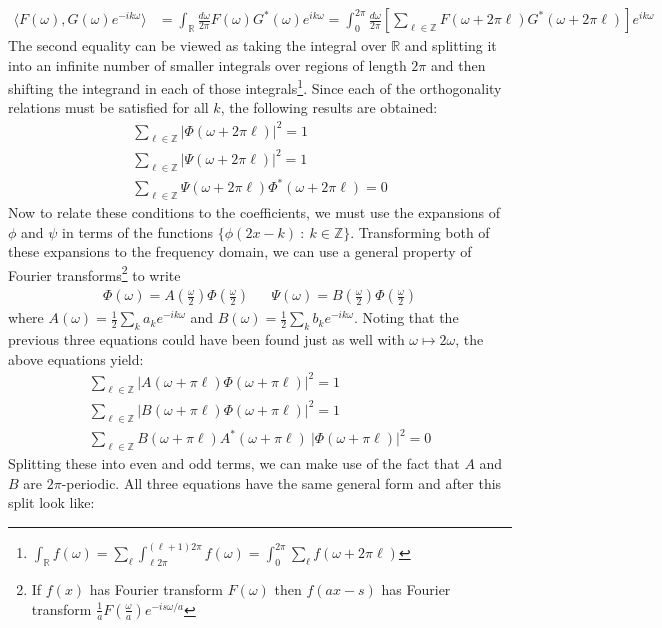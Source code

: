 \documentclass[onecolumn]{gwclass}
\begin{document}
\begin{align*}
	\langle F(\omega), G(\omega)e^{-ik\omega}\rangle &= \int_\mathbb{R}\frac{d\omega}{2\pi}F(\omega)G^*(\omega)e^{ik\omega} = \int_{0}^{2\pi}\frac{d\omega}{2\pi}\left[\sum_{\ell\in\mathbb{Z}}F(\omega + 2\pi\ell)G^*(\omega + 2\pi\ell)\right]e^{ik\omega}  
\end{align*}
The second equality can be viewed as taking the integral over $\mathbb{R}$ and splitting it into an infinite number of smaller integrals over regions of length $2\pi$ and then shifting the integrand in each of those integrals\footnote{$\int_\mathbb{R}f(\omega) = \sum_\ell \int_{\ell2\pi}^{(\ell+1)2\pi}f(\omega) = \int_0^{2\pi}\sum_\ell f(\omega + 2\pi\ell)$}. Since each of the orthogonality relations must be satisfied for all $k$, the following results are obtained:
\begin{align*}
	\textstyle{
		\sum_{\ell\in\mathbb{Z}} |\Phi(\omega + 2\pi\ell)|^2 = 1} \\
	\textstyle{ 
		\sum_{\ell\in\mathbb{Z}} |\Psi(\omega + 2\pi\ell)|^2 = 1} \\
	\textstyle{
		\sum_{\ell\in\mathbb{Z}} \Psi(\omega + 2\pi\ell)\Phi^*(\omega + 2\pi\ell) = 0}
\end{align*}
Now to relate these conditions to the coefficients, we must use the expansions of $\phi$ and $\psi$ in terms of the functions $\{\phi(2x - k)\::\:k\in\mathbb{Z}\}$. Transforming both of these expansions to the frequency domain, we can use a general property of Fourier transforms\footnote{If $f(x)$ has Fourier transform $F(\omega)$ then $f(ax - s)$ has Fourier transform $\frac{1}{a}F(\frac{\omega}{a}) e^{-is\omega /a}$} to write 
\begin{align*} 
	\Phi(\omega) = A\left(\frac{\omega}{2}\right) \Phi\left(\frac{\omega}{2}\right) &&
	\Psi(\omega) = B\left(\frac{\omega}{2}\right) \Phi\left(\frac{\omega}{2}\right) 
\end{align*}
where $A(\omega) = \frac{1}{2}\sum_k a_k e^{-ik\omega}$ and $B(\omega) = \frac{1}{2}\sum_k b_k e^{-ik\omega}$. Noting that the previous three equations could have been found just as well with $\omega\mapsto 2\omega$, the above equations yield:
\begin{align*}
	\textstyle{\sum_{\ell\in\mathbb{Z}} |A(\omega + \pi\ell)\Phi(\omega + \pi\ell)|^2 = 1} \\
	\textstyle{\sum_{\ell\in\mathbb{Z}} |B(\omega + \pi\ell)\Phi(\omega + \pi\ell)|^2 = 1} \\
	\textstyle{\sum_{\ell\in\mathbb{Z}} B(\omega + \pi\ell)A^*(\omega + \pi\ell)\:|\Phi(\omega + \pi\ell)|^2 = 0}
\end{align*}
Splitting these into even and odd terms, we can make use of the fact that $A$ and $B$ are $2\pi$-periodic. All three equations have the same general form and after this split look like:
\end{document}

